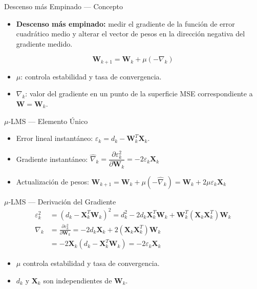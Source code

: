 \documentclass[aspectratio=169,utf8,spanish]{beamer}
\begin{document}
\begin{frame}{Descenso más Empinado — Concepto}
  \begin{itemize}
    \item \textbf{Descenso más empinado:} medir el gradiente de la función de error cuadrático medio y alterar el vector de pesos en la dirección negativa del gradiente medido.
  \end{itemize}

  \begin{equation*}
    \mathbf{W}_{k+1} = \mathbf{W}_k + \mu(-\nabla_k)
  \end{equation*}

  \begin{itemize}
    \item $\mu$: controla estabilidad y tasa de convergencia.
    \item $\nabla_k$: valor del gradiente en un punto de la superficie MSE correspondiente a $\mathbf{W} = \mathbf{W}_k$.
  \end{itemize}
\end{frame}


\begin{frame}{$\mu$-LMS — Elemento Único}
  \begin{itemize}
    \item Error lineal instantáneo: $\varepsilon_k = d_k - \mathbf{W}_k^T \mathbf{X}_k$.
    \item Gradiente instantáneo:
    $\hat{\nabla}_k = \dfrac{\partial \varepsilon_k^2}{\partial \mathbf{W}_k} = -2\varepsilon_k \mathbf{X}_k$
    \item Actualización de pesos:
    $\mathbf{W}_{k+1} = \mathbf{W}_k + \mu(-\hat{\nabla}_k) = \mathbf{W}_k + 2\mu\varepsilon_k \mathbf{X}_k$
  \end{itemize}
\end{frame}

\begin{frame}{$\mu$-LMS — Derivación del Gradiente}
  \begin{align*}
    \varepsilon_k^2 &= (d_k - \mathbf{X}_k^T \mathbf{W}_k)^2 = d_k^2 - 2d_k \mathbf{X}_k^T \mathbf{W}_k + \mathbf{W}_k^T (\mathbf{X}_k \mathbf{X}_k^T) \mathbf{W}_k \\[4pt]
    \nabla_k &= \frac{\partial \varepsilon_k^2}{\partial \mathbf{W}_k} = -2d_k \mathbf{X}_k + 2(\mathbf{X}_k \mathbf{X}_k^T) \mathbf{W}_k \\[4pt]
    &= -2\mathbf{X}_k (d_k - \mathbf{X}_k^T \mathbf{W}_k) = -2\varepsilon_k \mathbf{X}_k
  \end{align*}

  \begin{itemize}
    \item $\mu$ controla estabilidad y tasa de convergencia.
    \item $d_k$ y $\mathbf{X}_k$ son independientes de $\mathbf{W}_k$.
  \end{itemize}
\end{frame}
\end{document}
